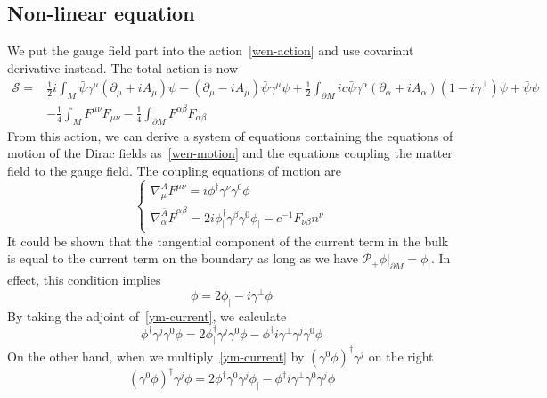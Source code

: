 \subsection{Non-linear equation}
We put the gauge field part into the action~\cref{wen-action} and use covariant derivative instead. 
The total action is now
\begin{equation*}
\begin{split}
\mathcal{S} = & \frac{1}{2}i\int_M \bar{\psi} \gamma^\mu (\partial_\mu+i A_\mu) \psi - (\partial_\mu - iA_\mu) \bar{\psi} \gamma^\mu \psi 
+ \frac{1}{2}\int_{\partial M} ic \bar{\psi} \gamma^\alpha (\partial_\alpha+iA_\alpha) (1 - i \gamma^\bot) \psi
+ \bar{\psi} \psi \\ 
%
& - \frac 1 4 \int_M F^{\mu\nu}F_{\mu\nu} - \frac 1 4 \int_{\partial M} F^{\alpha\beta}F_{\alpha\beta}
\end{split}
\end{equation*}
From this action, we can derive a system of equations containing the equations of motion of the Dirac fields as~\cref{wen-motion} and the equations coupling the matter field to the gauge field.
The coupling equations of motion are
\begin{equation*}
\begin{cases}
\nabla^A_\mu F^{\mu\nu} = i\phi^\dagger\gamma^\nu\gamma^0\phi \\
%
\nabla^{\bar{A}}_\alpha \bar{F}^{\alpha\beta} =2 i\phi_|^\dagger\gamma^\beta\gamma^0\phi_| -c^{-1}\bar{F}_{\nu\beta}n^\nu 
\end{cases}
\end{equation*}
It could be shown that the tangential component of the current term in the bulk is equal to the current term on the boundary as long as we have $\mathcal{P}_+\phi\vert_{\partial M} = \phi_|$. 
In effect, this condition implies
\begin{equation}\label{ym-current}
\phi = 2 \phi_| - i\gamma^\bot\phi
\end{equation}
By taking the adjoint of~\cref{ym-current}, we calculate
\begin{equation*}
\phi^\dagger\gamma^j\gamma^0\phi = 2 \phi_|^\dagger\gamma^j\gamma^0\phi - 
\phi^\dagger i \gamma^\bot\gamma^j\gamma^0\phi
\end{equation*}
On the other hand, when we multiply~\cref{ym-current} by $(\gamma^0\phi)^\dagger\gamma^j$ on the right
\begin{equation*}
(\gamma^0\phi)^\dagger\gamma^j\phi = 2\phi^\dagger\gamma^0\gamma^j\phi_| - 
\phi^\dagger i \gamma^\bot\gamma^0\gamma^j\phi
\end{equation*}












